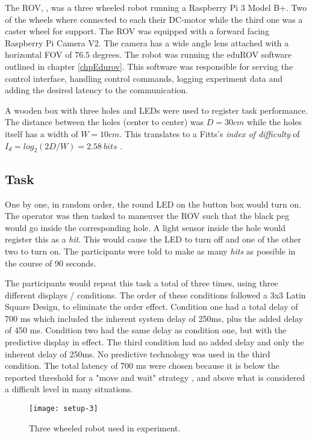 The ROV, , was a three wheeled robot running a Raspberry Pi 3 Model B+. Two of the wheels where connected to each their DC-motor while the third one was a caster wheel for support. The ROV was equipped with a forward facing Raspberry Pi Camera V2. The camera has a wide angle lens attached with a horizontal FOV of $76.5$ degrees. The robot was running the eduROV software outlined in chapter \ref{chpEdurov}. This software was responsible for serving the control interface, handling control commands, logging experiment data and adding the desired latency to the communication.

A wooden box with three holes and LEDs were used to register task performance. The distance between the holes (center to center) was $D=30cm$ while the holes itself has a width of $W=10cm$. This translates to a Fitts's \emph{index of difficulty} of $I_d=log_2\left ( 2D/W \right )=2.58\: bits$ \citep{Fitts1954}.

\subsection{Task}\label{task}

One by one, in random order, the round LED on the button box would turn on. The operator was then tasked to maneuver the ROV such that the black peg would go inside the corresponding hole. A light sensor inside the hole would register this as a \emph{hit}. This would cause the LED to turn off and one of the other two to turn on. The participants were told to make as many \emph{hits} as possible in the course of 90 seconds.

The participants would repeat this task a total of three times, using three different displays / conditions. The order of these conditions followed a 3x3 Latin Square Design, to eliminate the order effect. Condition one had a total delay of 700 ms which included the inherent system delay of 250ms, plus the added delay of 450 ms. Condition two had the same delay as condition one, but with the predictive display in effect. The third condition had no added delay and only the inherent delay of 250ms. No predictive technology was used in the third condition. The total latency of 700 ms were chosen because it is below the reported threshold for a "move and wait" strategy \citep{Chen2007}, and above what is considered a difficult level in many situations.

\begin{figure}[h!]
    \centering
    \texttt{[image: setup-3]}
    \caption{Three wheeled robot used in experiment.}
    \label{setup3}
\end{figure}

